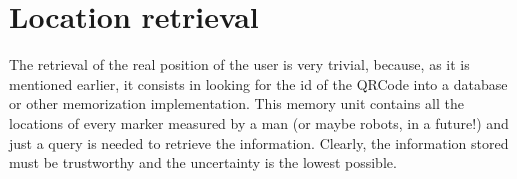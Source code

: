 \section{Location retrieval}
The retrieval of the real position of the user is very trivial, because, as it is mentioned earlier, it consists in looking for the id of the QRCode into a database or other memorization implementation.
This memory unit contains all the locations of every marker measured by a man (or maybe robots, in a future!) and just a query is needed to retrieve the information.
Clearly, the information stored must be trustworthy and the uncertainty is the lowest possible.

